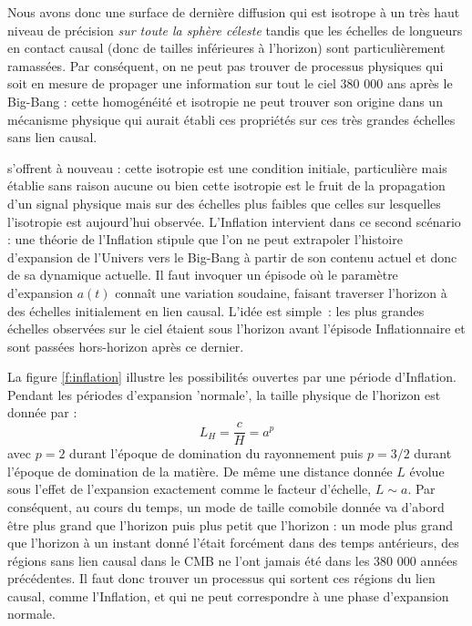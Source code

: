 Nous avons donc une surface de dernière diffusion qui est isotrope à un très haut niveau de précision \textit{sur toute la sphère céleste} tandis que les échelles de longueurs en contact causal (donc de tailles inférieures à l'horizon) sont particulièrement ramassées. Par conséquent, on ne peut pas trouver de processus physiques qui soit en mesure de propager une information sur tout le ciel 380 000 ans après le Big-Bang : cette homogénéité et isotropie ne peut trouver son origine dans un mécanisme physique qui aurait établi ces propriétés sur ces très grandes échelles sans lien causal.

 s'offrent à nouveau : cette isotropie est une condition initiale, particulière mais établie sans raison aucune ou bien cette isotropie est le fruit de la propagation d'un signal physique mais sur des échelles plus faibles que celles sur lesquelles l'isotropie est aujourd'hui observée. L'Inflation intervient dans ce second scénario : une théorie de l'Inflation stipule que l'on ne peut extrapoler l'histoire d'expansion de l'Univers vers le Big-Bang à partir de son contenu actuel et donc de sa dynamique actuelle. Il faut invoquer un épisode où le paramètre d'expansion $a(t)$ connaît une variation soudaine, faisant traverser l'horizon à des échelles initialement en lien causal. L'idée est simple~: les plus grandes échelles observées sur le ciel étaient sous l'horizon avant l'épisode Inflationnaire et sont passées hors-horizon après ce dernier. 

La figure \ref{f:inflation} illustre les possibilités ouvertes par une période d'Inflation. Pendant les périodes d'expansion 'normale', la taille physique de l'horizon est donnée par :
\begin{equation}
L_H=\frac{c}{H}=a^p
\end{equation}
avec $p=2$ durant l'époque de domination du rayonnement puis $p=3/2$ durant l'époque de domination de la matière. De même une distance donnée $L$ évolue sous l'effet de l'expansion exactement comme le facteur d'échelle, $L\sim a$. Par conséquent, au cours du temps, un mode de taille comobile donnée va d'abord être plus grand que l'horizon puis plus petit que l'horizon : un mode plus grand que l'horizon à un instant donné l'était forcément dans des temps antérieurs, des régions sans lien causal dans le CMB ne l'ont jamais été dans les 380 000 années précédentes. Il faut donc trouver un processus qui sortent ces régions du lien causal, comme l'Inflation, et qui ne peut correspondre à une phase d'expansion normale.

